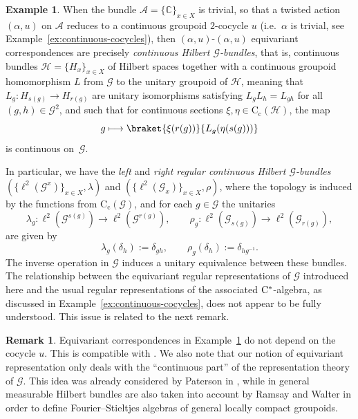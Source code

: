 \documentclass[11 pt, leqno]{amsart}
\numberwithin{equation}{section}
\theoremstyle{plain}
\theoremstyle{definition}
\newtheorem {rem} [thm]{Remark}
\newtheorem{ex}[thm]{Example}
\newcommand*{\contc}{\mathrm{C_c}}%
\renewcommand{\H}{\mathcal H}
\newcommand{\G}{\mathcal G} %
\newcommand{\A}{\mathcal A}
\newcommand{\C}{\mathbb C}
\newcommand{\cst}{\ifmmode\mathrm{C}^*\else{$\mathrm{C}^*$}\fi}
\begin{document}
\begin{ex}\label{ex:continuous_Hilbert_G-bundles}
When the bundle $\A=\{\C\}_{x\in X}$ is trivial, so that a twisted action $(\alpha,u)$ on $\A$ reduces to a continuous groupoid $2$-cocycle $u$ (i.e.\ $\alpha$ is trivial, see Example~\ref{ex:continuous-cocycles}), then $(\alpha,u)$-$(\alpha,u)$ equivariant correspondences are precisely \emph{continuous Hilbert $\G$-bundles}, that is, continuous bundles $\H=\{H_x\}_{x\in X}$ of Hilbert spaces together with a continuous groupoid homomorphism $L$ from $\G$ to the unitary groupoid of $\H$, meaning that $L_g\colon H_{s(g)}\!\to H_{r(g)}$ are unitary isomorphisms satisfying $L_g L_h=L_{gh}$ for all $(g,h)\in \G^2$, and such that for continuous sections $\xi,\eta\in \contc(\H)$, the map 
\[
g\longmapsto \braket{\xi(r(g))}{L_g(\eta(s(g)))}
\]
is continuous on~$\G$. 

In particular, we have the \emph{left} and \emph{right regular continuous Hilbert $\G$-bundles}  
$(\{\ell^2(\G^x)\}_{x\in X}, \lambda)$ and $(\{\ell^2(\G_x)\}_{x\in X}, \rho)$, 
where the topology is induced by the functions from $\contc(\G)$, and for each $g\in\G$ the unitaries 
\[
\lambda_g\colon \ell^2(\G^{s(g)})\!\to\! \ell^2(\G^{r(g)}),
\qquad 
\rho_{g}\colon \ell^2(\G_{s(g)})\!\to\! \ell^2(\G_{r(g)}),
\]
are given by
\[
    \lambda_g(\delta_h):=\delta_{gh},
    \qquad 
    \rho_g (\delta_{h}):=\delta_{hg^{-1}}.
\] 
The inverse operation in $\G$ induces a unitary equivalence between these bundles. 
The relationship between the equivariant regular representations of $\G$ introduced here and the usual regular representations of the associated $\cst$-algebra, as discussed in Example~\ref{ex:continuous-cocycles}, does not appear to be fully understood. This issue is related to the next remark.
\end{ex}

\begin{rem}\label{rem:do-not-depend-on-twist}
Equivariant correspondences in Example~\ref{ex:continuous_Hilbert_G-bundles}  do not depend on the cocycle $u$. 
This is compatible with \cite[Remark~3.2]{BedosConti2}.
We also note that our notion of equivariant representation only deals with the “continuous part” of the representation theory of $\G$. 
This idea was already considered by Paterson in \cite{Paterson}, while in \cite{RamsayWalter} general measurable Hilbert bundles are also taken into account by Ramsay and Walter in order to define Fourier–Stieltjes algebras of general locally compact groupoids.
\end{rem}
\end{document}
